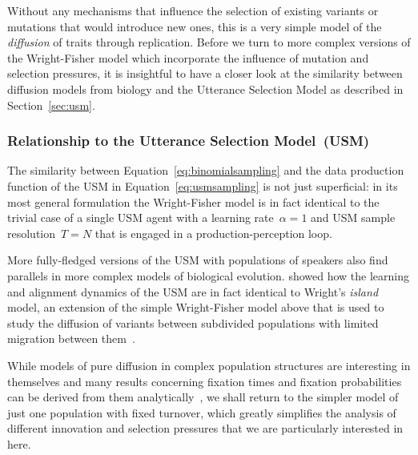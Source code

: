 Without any mechanisms that influence the selection of existing variants or mutations that would introduce new ones, this is a very simple model of the \emph{diffusion} of traits through replication. Before we turn to more complex versions of the Wright-Fisher model which incorporate the influence of mutation and selection pressures, it is insightful to have a closer look at the similarity between diffusion models from biology and the Utterance Selection Model as described in Section~\ref{sec:usm}.

\subsubsection{Relationship to the Utterance Selection Model~(USM)}

The similarity between Equation~\ref{eq:binomialsampling} and the data production function of the USM in Equation~\ref{eq:usmsampling} is not just superficial: in its most general formulation the Wright-Fisher model is in fact identical to the trivial case of a single USM agent with a learning rate~$\alpha=1$ and USM sample resolution~$T=N$ that is engaged in a production-perception loop.

More fully-fledged versions of the USM with populations of speakers also find parallels in more complex models of biological evolution. \citet{Blythe2007divided} showed how the learning and alignment dynamics of the USM are in fact identical to Wright's \emph{island} model, an extension of the simple Wright-Fisher model above that is used to study the diffusion of variants between subdivided populations with limited migration between them~\citep{Wright1943}.

While models of pure diffusion in complex population structures are interesting in themselves and many results concerning fixation times and fixation probabilities can be derived from them analytically~\citep[see e.g.][]{Imhof2006,Baxter2008,Blythe2012copying,Michaud2016}, we shall return to the simpler model of just one population with fixed turnover, which greatly simplifies the analysis of different innovation and selection pressures that we are particularly interested in here.


